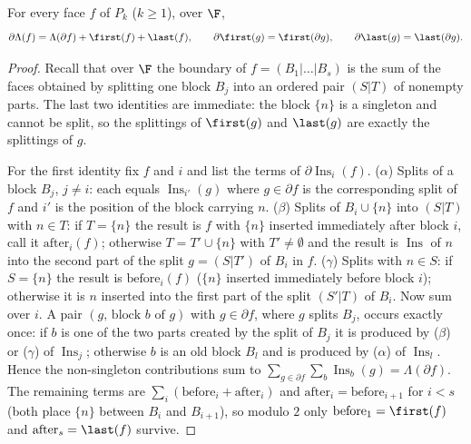 \begin{lemma}\label{lem:LT0}
For every face $f$ of $P_k$ ($k\ge1$), over $\F$,
\[
\partial\Lambda(f)=\Lambda(\partial f)+\first(f)+\last(f),\qquad \partial\first(g)=\first(\partial g),\qquad \partial\last(g)=\last(\partial g).
\]
\end{lemma}
\begin{proof}
Recall that over $\F$ the boundary of $f=(B_1|\dots|B_s)$ is the sum of the faces obtained by splitting one block $B_j$ into an ordered pair $(S|T)$ of nonempty parts. The last two identities are immediate: the block $\{n\}$ is a singleton and cannot be split, so the splittings of $\first(g)$ and $\last(g)$ are exactly the splittings of $g$.

For the first identity fix $f$ and $i$ and list the terms of $\partial\operatorname{Ins}_i(f)$. (\emph{$\alpha$}) Splits of a block $B_j$, $j\ne i$: each equals $\operatorname{Ins}_{i'}(g)$ where $g\in\partial f$ is the corresponding split of $f$ and $i'$ is the position of the block carrying $n$. (\emph{$\beta$}) Splits of $B_i\cup\{n\}$ into $(S|T)$ with $n\in T$: if $T=\{n\}$ the result is $f$ with $\{n\}$ inserted immediately after block $i$, call it $\mathrm{after}_i(f)$; otherwise $T=T'\cup\{n\}$ with $T'\ne\emptyset$ and the result is $\operatorname{Ins}$ of $n$ into the second part of the split $g=(S|T')$ of $B_i$ in $f$. (\emph{$\gamma$}) Splits with $n\in S$: if $S=\{n\}$ the result is $\mathrm{before}_i(f)$ ($\{n\}$ inserted immediately before block $i$); otherwise it is $n$ inserted into the first part of the split $(S'|T)$ of $B_i$.
Now sum over $i$. A pair $(g,\,\text{block }b\text{ of }g)$ with $g\in\partial f$, where $g$ splits $B_j$, occurs exactly once: if $b$ is one of the two parts created by the split of $B_j$ it is produced by ($\beta$) or ($\gamma$) of $\operatorname{Ins}_j$; otherwise $b$ is an old block $B_l$ and is produced by ($\alpha$) of $\operatorname{Ins}_l$. Hence the non-singleton contributions sum to $\sum_{g\in\partial f}\sum_b\operatorname{Ins}_b(g)=\Lambda(\partial f)$. The remaining terms are $\sum_i(\mathrm{before}_i+\mathrm{after}_i)$ and $\mathrm{after}_i=\mathrm{before}_{i+1}$ for $i<s$ (both place $\{n\}$ between $B_i$ and $B_{i+1}$), so modulo $2$ only $\mathrm{before}_1=\first(f)$ and $\mathrm{after}_s=\last(f)$ survive.
\end{proof}

